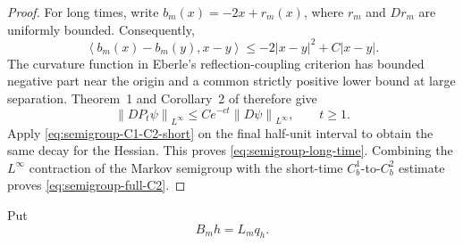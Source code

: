 \documentclass[11pt,reqno]{amsart}
\numberwithin{equation}{section}
\theoremstyle{definition}
\theoremstyle{remark}
\newcommand{\norm}[1]{\left\lVert#1\right\rVert}
\newcommand{\ip}[2]{\left\langle#1,#2\right\rangle}
\begin{document}
\begin{proof}
For long times, write $b_m(x)=-2x+r_m(x)$, where $r_m$ and $Dr_m$ are uniformly bounded. Consequently,
\begin{equation}\label{eq:drift-dissipativity}
 \ip{b_m(x)-b_m(y)}{x-y}\leq-2|x-y|^2+C|x-y|.
\end{equation}
The curvature function in Eberle's reflection-coupling criterion has bounded negative part near the origin and a common strictly positive lower bound at large separation. Theorem~1 and Corollary~2 of \cite{Eberle} therefore give
\begin{equation}\label{eq:semigroup-Lipschitz-contraction}
 \norm{DP_t\psi}_{L^\infty}\leq Ce^{-ct}\norm{D\psi}_{L^\infty},
 \qquad t\geq1.
\end{equation}
Apply \eqref{eq:semigroup-C1-C2-short} on the final half-unit interval to obtain the same decay for the Hessian. This proves \eqref{eq:semigroup-long-time}. Combining the $L^\infty$ contraction of the Markov semigroup with the short-time $C_b^1$-to-$C_b^2$ estimate proves \eqref{eq:semigroup-full-C2}.
\end{proof}

Put
\begin{equation}\label{eq:confined-B-operator}
 B_mh=L_mq_h.
\end{equation}
\end{document}
